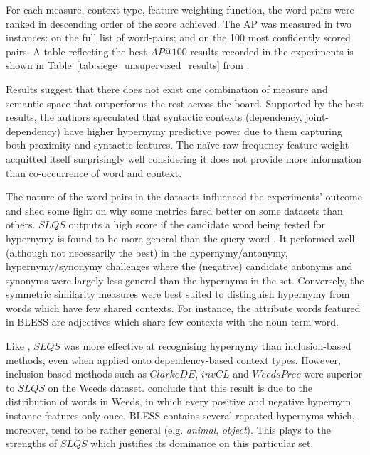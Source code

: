 For each measure, context-type, feature weighting function, the word-pairs were ranked in descending order of the score achieved.  The \ac{AP} was measured in two instances: on the full list of word-pairs; and on the 100 most confidently scored pairs.  A table reflecting the best $AP@100$ results recorded in the experiments is shown in Table~\ref{tab:siege_unsupervised_results} from \citet{shwartz2017siege}.

Results suggest that there does not exist one combination of measure and semantic space that outperforms the rest across the board.  Supported by the best results, the authors speculated that syntactic contexts (dependency, joint-dependency) have higher hypernymy predictive power due to them capturing both proximity and syntactic features.  The na\"ive raw frequency feature weight acquitted itself surprisingly well considering it does not provide more information than co-occurrence of word and context.

The nature of the word-pairs in the datasets influenced the experiments’ outcome and shed some light on why some metrics fared better on some datasets than others.  $SLQS$ outputs a high score if the candidate word being tested for hypernymy is found to be more general than the query word \citep{santus2014chasing}.  It performed well (although not necessarily the best) in the hypernymy/antonymy, hypernymy/synonymy challenges where the (negative) candidate antonyms and synonyms were largely less general than the hypernyms in the set.  Conversely, the symmetric similarity measures were best suited to distinguish hypernymy from words which have few shared contexts.  For instance, the attribute words featured in BLESS are adjectives which share few contexts with the noun term word.  

Like \citep{santus2014chasing}, $SLQS$ was more effective at recognising hypernymy than inclusion-based methods, even when applied onto dependency-based context types.  However, inclusion-based methods such as $ClarkeDE$, $invCL$ and $WeedsPrec$ were superior to $SLQS$ on the Weeds dataset.  \citet{shwartz2017siege} conclude that this result is due to the distribution of words in Weeds, in which every positive and negative hypernym instance features only once.  BLESS contains several repeated hypernyms which, moreover, tend to be rather general (e.g. \textit{animal}, \textit{object}).  This plays to the strengths of $SLQS$ which justifies its dominance on this particular set.

